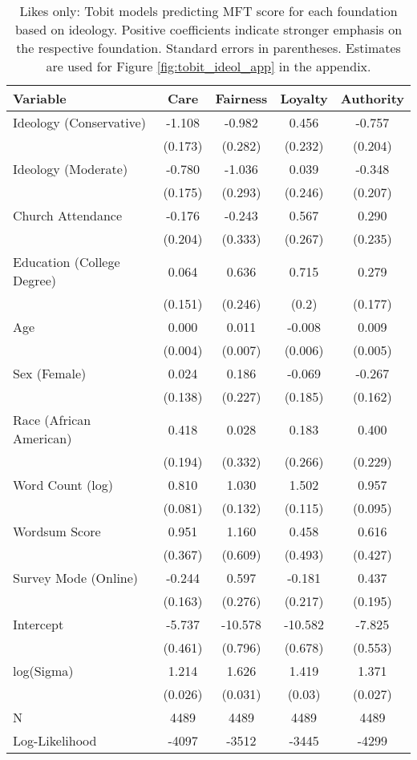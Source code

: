 \begin{table}[ht]
\centering
\caption{Likes only: Tobit models predicting MFT score for each foundation based 
           on ideology. Positive coefficients indicate stronger emphasis on the respective 
           foundation. Standard errors in parentheses. Estimates are used for 
           Figure \ref{fig:tobit_ideol_app} in the appendix.} 
\label{tab:tobit_like}
\begingroup\footnotesize
\begin{tabular}{lcccc}
  \hline
Variable & Care & Fairness & Loyalty & Authority \\ 
  \hline
Ideology (Conservative) & -1.108 &  -0.982 &   0.456 & -0.757 \\ 
   & (0.173) & (0.282) & (0.232) & (0.204) \\ 
  Ideology (Moderate) & -0.780 &  -1.036 &   0.039 & -0.348 \\ 
   & (0.175) & (0.293) & (0.246) & (0.207) \\ 
  Church Attendance & -0.176 &  -0.243 &   0.567 &  0.290 \\ 
   & (0.204) & (0.333) & (0.267) & (0.235) \\ 
  Education (College Degree) &  0.064 &   0.636 &   0.715 &  0.279 \\ 
   & (0.151) & (0.246) & (0.2) & (0.177) \\ 
  Age &  0.000 &   0.011 &  -0.008 &  0.009 \\ 
   & (0.004) & (0.007) & (0.006) & (0.005) \\ 
  Sex (Female) &  0.024 &   0.186 &  -0.069 & -0.267 \\ 
   & (0.138) & (0.227) & (0.185) & (0.162) \\ 
  Race (African American) &  0.418 &   0.028 &   0.183 &  0.400 \\ 
   & (0.194) & (0.332) & (0.266) & (0.229) \\ 
  Word Count (log) &  0.810 &   1.030 &   1.502 &  0.957 \\ 
   & (0.081) & (0.132) & (0.115) & (0.095) \\ 
  Wordsum Score &  0.951 &   1.160 &   0.458 &  0.616 \\ 
   & (0.367) & (0.609) & (0.493) & (0.427) \\ 
  Survey Mode (Online) & -0.244 &   0.597 &  -0.181 &  0.437 \\ 
   & (0.163) & (0.276) & (0.217) & (0.195) \\ 
  Intercept & -5.737 & -10.578 & -10.582 & -7.825 \\ 
   & (0.461) & (0.796) & (0.678) & (0.553) \\ 
  log(Sigma) &  1.214 &   1.626 &   1.419 &  1.371 \\ 
   & (0.026) & (0.031) & (0.03) & (0.027) \\ 
   \hline
N & 4489 & 4489 & 4489 & 4489 \\ 
  Log-Likelihood & -4097 & -3512 & -3445 & -4299 \\ 
   \hline
\end{tabular}
\endgroup
\end{table}
